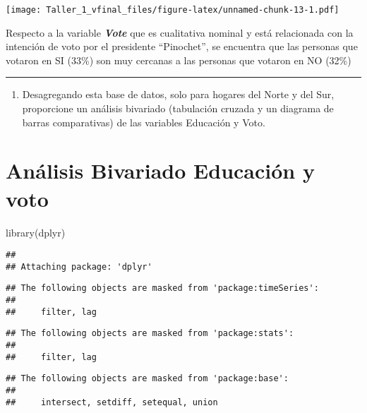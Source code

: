 \documentclass[
]{article}
\newenvironment{Shaded}{\begin{snugshade}}{\end{snugshade}}
\newcommand{\FunctionTok}[1]{\textcolor[rgb]{0.00,0.00,0.00}{#1}}
\newcommand{\NormalTok}[1]{#1}
\providecommand{\tightlist}{%
  \setlength{\itemsep}{0pt}\setlength{\parskip}{0pt}}
\begin{document}
\texttt{[image: Taller\_1\_vfinal\_files/figure-latex/unnamed-chunk-13-1.pdf]}

Respecto a la variable \textbf{\emph{Vote}} que es cualitativa nominal y
está relacionada con la intención de voto por el presidente
``Pinochet'', se encuentra que las personas que votaron en SI (33\%) son
muy cercanas a las personas que votaron en NO (32\%)

\begin{center}\rule{0.5\linewidth}{0.5pt}\end{center}

\begin{enumerate}
\def\labelenumi{\alph{enumi})}
\setcounter{enumi}{2}
\tightlist
\item
  Desagregando esta base de datos, solo para hogares del Norte y del
  Sur, proporcione un análisis bivariado (tabulación cruzada y un
  diagrama de barras comparativas) de las variables Educación y Voto.
\end{enumerate}

\hypertarget{anuxe1lisis-bivariado-educaciuxf3n-y-voto}{%
\section{Análisis Bivariado Educación y
voto}\label{anuxe1lisis-bivariado-educaciuxf3n-y-voto}}

\begin{Shaded}
\begin{Highlighting}[]
\FunctionTok{library}\NormalTok{(dplyr)}
\end{Highlighting}
\end{Shaded}

\begin{verbatim}
## 
## Attaching package: 'dplyr'
\end{verbatim}

\begin{verbatim}
## The following objects are masked from 'package:timeSeries':
## 
##     filter, lag
\end{verbatim}

\begin{verbatim}
## The following objects are masked from 'package:stats':
## 
##     filter, lag
\end{verbatim}

\begin{verbatim}
## The following objects are masked from 'package:base':
## 
##     intersect, setdiff, setequal, union
\end{verbatim}
\end{document}
